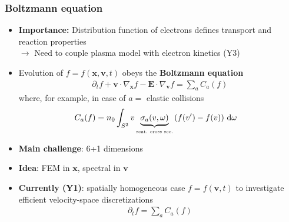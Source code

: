 \documentclass[mathserif, aspectratio=169]{beamer}
\newcommand{\ud}{\,\mathrm{d}}
\newcommand{\vect}[1]{\boldsymbol{#1}}
\begin{document}
\begin{frame}
\frametitle{Boltzmann equation}
%
\begin{itemize}
\item \textbf{Importance:} 
Distribution function of electrons defines transport and reaction properties
\\
$\rightarrow$ Need to couple plasma model with electron kinetics (Y3)
\item Evolution of $f = f(\vect{x}, \vect{v}, t)$ obeys the \textbf{Boltzmann equation}
\small
\begin{align*}
\partial_t f + \vect{v}\cdot \nabla_{\vect{x}} f  - \vect{E} \cdot \nabla_{\vect{v }}f = \sum_{a} C_a(f)
\end{align*}
where, for example, in case of $a=$ elastic collisions
\begin{align*}
C_a(f) &= n_0\int_{S^2} v \underbrace{\sigma_a(v,\omega)}_{\tiny\text{\tiny scat. cross sec.}} 
\left( f(v^\prime) - f(v) \right) \ud \omega 
\end{align*}
\item \textbf{Main challenge}: 6+1 dimensions
\item \textbf{Idea}: FEM in $\vect{x}$, spectral in $\vect{v}$
\item \textbf{Currently (Y1)}: spatially homogeneous case $f = f(\vect{v}, t)$ to investigate efficient velocity-space discretizations
\begin{align*}
\partial_t f = \sum_{a} C_a(f)
\end{align*}
\end{itemize}
%
\end{frame}
%
\end{document}
